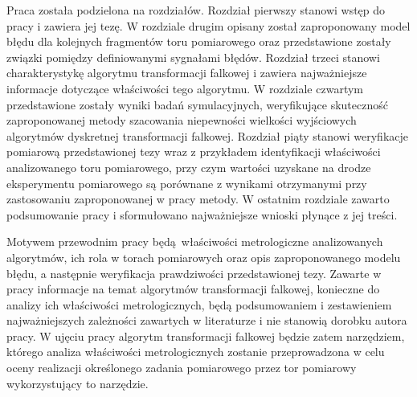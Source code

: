 Praca została podzielona na  rozdziałów. Rozdział pierwszy stanowi wstęp do pracy i zawiera jej tezę. W rozdziale drugim opisany został zaproponowany model błędu dla kolejnych fragmentów toru pomiarowego oraz przedstawione zostały związki pomiędzy definiowanymi sygnałami błędów. Rozdział trzeci stanowi charakterystykę algorytmu transformacji falkowej i zawiera najważniejsze informacje dotyczące właściwości tego algorytmu. W rozdziale czwartym przedstawione zostały wyniki badań symulacyjnych, weryfikujące skuteczność zaproponowanej metody szacowania niepewności wielkości wyjściowych algorytmów dyskretnej transformacji falkowej. Rozdział piąty stanowi weryfikacje pomiarową przedstawionej tezy wraz z przykładem identyfikacji właściwości analizowanego toru pomiarowego, przy czym wartości uzyskane na drodze eksperymentu pomiarowego są porównane z wynikami otrzymanymi przy zastosowaniu zaproponowanej w pracy metody. W ostatnim rozdziale zawarto podsumowanie pracy i sformułowano najważniejsze wnioski płynące z jej treści.

Motywem przewodnim pracy będą właściwości metrologiczne analizowanych algorytmów, ich rola w torach pomiarowych oraz opis zaproponowanego modelu błędu, a następnie weryfikacja prawdziwości przedstawionej tezy. Zawarte w pracy informacje na temat algorytmów transformacji falkowej, konieczne do analizy ich właściwości metrologicznych, będą podsumowaniem i zestawieniem najważniejszych zależności zawartych w literaturze i nie stanowią dorobku autora pracy. W ujęciu pracy algorytm transformacji falkowej będzie zatem narzędziem, którego analiza właściwości metrologicznych zostanie przeprowadzona w celu oceny realizacji określonego zadania pomiarowego przez tor pomiarowy wykorzystujący to narzędzie.
